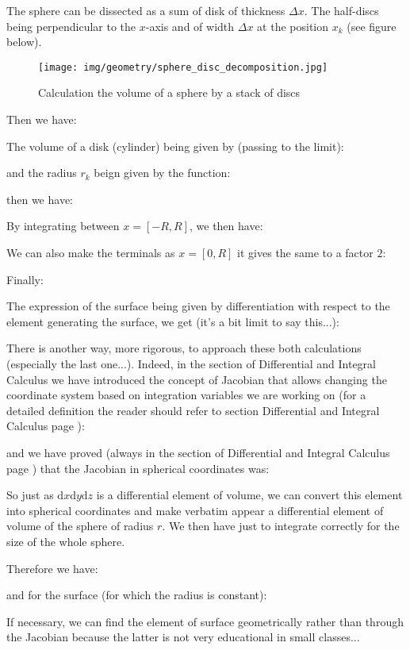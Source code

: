 {	The sphere can be dissected as a sum of disk of thickness $\Delta x$. The half-discs being perpendicular to the $x$-axis and of width $\Delta x$ at the position $x_k$  (see figure below).
	\begin{figure}[H]
		\centering
		\texttt{[image: img/geometry/sphere\_disc\_decomposition.jpg]}
		\caption{Calculation the volume of a sphere by a stack of discs}
	\end{figure}
	Then we have:
	
	The volume of a disk (cylinder) being given by (passing to the limit):
	
	and the radius $r_k$ beign given by the function:
	
	then we have:
	
	By integrating between $x=[-R,R]$, we then have:
	
	We can also make the terminals as $x=[0,R]$ it gives the same to a factor $2$:
	
	Finally:
	
	The expression of the surface being given by differentiation with respect to the element generating the surface, we get (it's a bit limit to say this...)\label{surface of a sphere}:
	
	There is another way, more rigorous, to approach these both calculations (especially the last one...). Indeed, in the section of Differential and Integral Calculus we have introduced the concept of Jacobian that allows changing the coordinate system based on integration variables we are working on (for a detailed definition the reader should refer to section Differential and Integral Calculus page \pageref{jacobian}):
	
	and we have proved (always in the section of Differential and Integral Calculus page \pageref{jacobian spherical coordinates}) that the Jacobian in spherical coordinates was:
	
	So just as $\mathrm{d}x\mathrm{d}y\mathrm{d}z$ is a differential element of volume, we can convert this element into spherical coordinates and make verbatim appear a differential element of volume of the sphere of radius $r$. We then have just to integrate correctly for the size of the whole sphere.

	Therefore we have:
	
	and for the surface (for which the radius is constant):
	
	If necessary, we can find the element of surface geometrically rather than through the Jacobian because the latter is not very educational in small classes...
	
}
